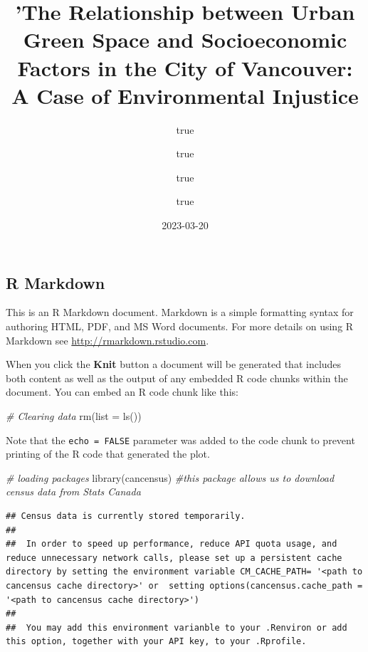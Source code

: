 \documentclass[
]{article}
\title{'The Relationship between Urban Green Space and Socioeconomic
Factors in the City of Vancouver: A Case of Environmental Injustice}
\author{true \and true \and true \and true}
\date{2023-03-20}
\newenvironment{Shaded}{\begin{snugshade}}{\end{snugshade}}
\newcommand{\AttributeTok}[1]{\textcolor[rgb]{0.77,0.63,0.00}{#1}}
\newcommand{\CommentTok}[1]{\textcolor[rgb]{0.56,0.35,0.01}{\textit{#1}}}
\newcommand{\FunctionTok}[1]{\textcolor[rgb]{0.00,0.00,0.00}{#1}}
\newcommand{\NormalTok}[1]{#1}
\begin{document}
\maketitle

\hypertarget{r-markdown}{%
\subsection{R Markdown}\label{r-markdown}}

This is an R Markdown document. Markdown is a simple formatting syntax
for authoring HTML, PDF, and MS Word documents. For more details on
using R Markdown see \url{http://rmarkdown.rstudio.com}.

When you click the \textbf{Knit} button a document will be generated
that includes both content as well as the output of any embedded R code
chunks within the document. You can embed an R code chunk like this:

\begin{Shaded}
\begin{Highlighting}[]
\CommentTok{\# Clearing data}
\FunctionTok{rm}\NormalTok{(}\AttributeTok{list =} \FunctionTok{ls}\NormalTok{())}
\end{Highlighting}
\end{Shaded}

Note that the \texttt{echo\ =\ FALSE} parameter was added to the code
chunk to prevent printing of the R code that generated the plot.

\begin{Shaded}
\begin{Highlighting}[]
\CommentTok{\# loading packages}
\FunctionTok{library}\NormalTok{(cancensus) }\CommentTok{\#this package allows us to download census data from Stats Canada}
\end{Highlighting}
\end{Shaded}

\begin{verbatim}
## Census data is currently stored temporarily.
## 
##  In order to speed up performance, reduce API quota usage, and reduce unnecessary network calls, please set up a persistent cache directory by setting the environment variable CM_CACHE_PATH= '<path to cancensus cache directory>' or  setting options(cancensus.cache_path = '<path to cancensus cache directory>')
## 
##  You may add this environment varianble to your .Renviron or add this option, together with your API key, to your .Rprofile.
\end{verbatim}
\end{document}
